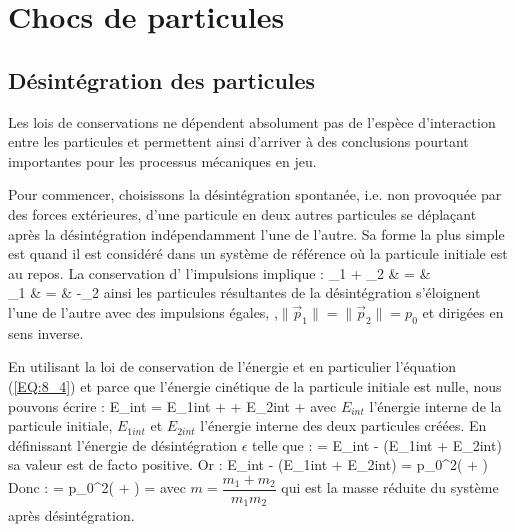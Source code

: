\chapter{Chocs de particules}

\section{D\'esint\'egration des particules}

Les lois de conservations ne d\'ependent absolument pas de l'esp\`ece d'interaction entre les particules et permettent ainsi d'arriver \`a des conclusions pourtant importantes pour les processus m\'ecaniques en jeu.

Pour commencer, choisissons la d\'esint\'egration spontan\'ee, i.e. non provoqu\'ee par des forces ext\'erieures, d'une particule en deux autres particules se d\'epla\c{c}ant apr\`es la d\'esint\'egration ind\'ependamment l'une de l'autre. Sa forme la plus simple est quand il est consid\'er\'e dans un syst\`eme de r\'ef\'erence o\`u la particule initiale est au repos. La conservation d' l'impulsions implique :
\bea
	_{1} + _{2} & = &  \nonumber \\
	_{1} & = & -_{2} \nonumber
\eea
ainsi les particules r\'esultantes de la d\'esint\'egration s'\'eloignent l'une de l'autre avec des impulsions \'egales, ,$\lVert \vec{p}_{1} \rVert = \lVert \vec{p}_{2} \rVert = p_{0}$ et dirig\'ees en sens inverse.

En utilisant la loi de conservation de l'\'energie et en particulier l'\'equation (\ref{EQ:8_4}) et parce que l'\'energie cin\'etique de la particule initiale est nulle, nous pouvons \'ecrire :
\benn
	E_{int} = E_{1int} +  + E_{2int} + 
\eenn
avec $E_{int}$ l'\'energie interne de la particule initiale, $E_{1int}$ et $E_{2int}$ l'\'energie interne des deux particules cr\'e\'ees. En d\'efinissant l'\'energie de d\'esint\'egration $\epsilon$ telle que :
\be
	\epsilon = E_{int} - (E_{1int} + E_{2int}) \label{EQ:16_1}
\ee
sa valeur est de facto positive. Or :
\benn
	E_{int} - (E_{1int} + E_{2int}) = p_{0}^{2}\left( + \right)
\eenn
Donc :
\be
	\epsilon = p_{0}^{2}\left( + \right) =  \label{EQ:16_2}
\ee
avec $m = \dfrac{m_{1} + m_{2}}{m_{1}m_{2}}$ qui est la masse r\'eduite du syst\`eme apr\`es d\'esint\'egration.

